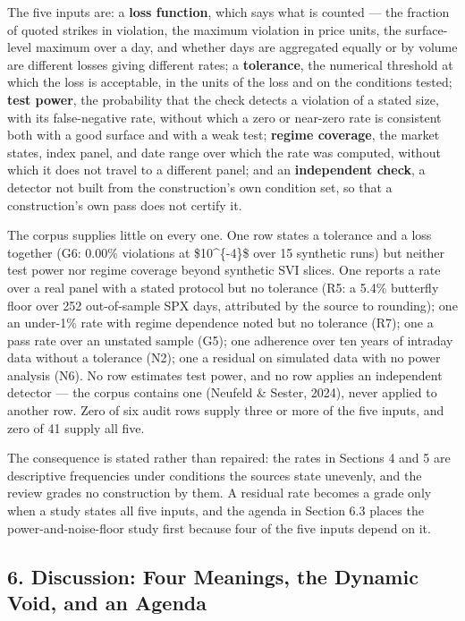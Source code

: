 \documentclass[11pt]{article}
\begin{document}
The five inputs are: a \textbf{loss function}, which says what is counted — the fraction of quoted strikes in violation, the maximum violation in price units, the surface-level maximum over a day, and whether days are aggregated equally or by volume are different losses giving different rates; a \textbf{tolerance}, the numerical threshold at which the loss is acceptable, in the units of the loss and on the conditions tested; \textbf{test power}, the probability that the check detects a violation of a stated size, with its false-negative rate, without which a zero or near-zero rate is consistent both with a good surface and with a weak test; \textbf{regime coverage}, the market states, index panel, and date range over which the rate was computed, without which it does not travel to a different panel; and an \textbf{independent check}, a detector not built from the construction's own condition set, so that a construction's own pass does not certify it.

The corpus supplies little on every one. One row states a tolerance and a loss together (G6: 0.00\% violations at \$10\textasciicircum{}\{-4\}\$ over 15 synthetic runs) but neither test power nor regime coverage beyond synthetic SVI slices. One reports a rate over a real panel with a stated protocol but no tolerance (R5: a 5.4\% butterfly floor over 252 out-of-sample SPX days, attributed by the source to rounding); one an under-1\% rate with regime dependence noted but no tolerance (R7); one a pass rate over an unstated sample (G5); one adherence over ten years of intraday data without a tolerance (N2); one a residual on simulated data with no power analysis (N6). No row estimates test power, and no row applies an independent detector — the corpus contains one (Neufeld \& Sester, 2024), never applied to another row. Zero of six audit rows supply three or more of the five inputs, and zero of 41 supply all five.

The consequence is stated rather than repaired: the rates in Sections 4 and 5 are descriptive frequencies under conditions the sources state unevenly, and the review grades no construction by them. A residual rate becomes a grade only when a study states all five inputs, and the agenda in Section 6.3 places the power-and-noise-floor study first because four of the five inputs depend on it.

\subsection*{6. Discussion: Four Meanings, the Dynamic Void, and an Agenda}
\end{document}
